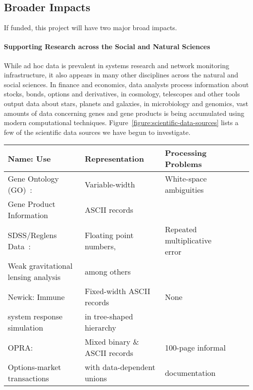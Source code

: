 \documentclass[11pt]{article}
\begin{document}
\subsection{Broader Impacts}
\label{ssec:impact}

If funded, this project will have two major broad impacts.

\paragraph*{Supporting Research across the Social and Natural Sciences}
While ad hoc data is prevalent in systems research and network monitoring
infrastructure, it also appears in many other disciplines
across the natural and social sciences. In finance and economics,
data analysts process information about stocks, bonds, options and derivatives,
in cosmology, telescopes and other tools output data about stars, planets and
galaxies, in microbiology and genomics, vast amounts of data concerning
genes and gene products is being accumulated using modern computational techniques.
Figure~\ref{figure:scientific-data-sources} lists a few of the scientific data sources
we have begun to investigate.

\begin{figure*}
\begin{center}
\begin{tabular}{@{}|l|l|l|l|l|}
\hline
Name: Use                           & Representation    & Processing Problems \\ \hline\hline
Gene Ontology (GO)~\cite{geneontology}:                  & Variable-width    & White-space ambiguities \\
Gene Product Information 	      & ASCII records &  \\ \hline
SDSS/Reglens Data~\cite{mandelbaum+:reglens}:                & Floating point numbers, & Repeated multiplicative error \\
Weak gravitational lensing analysis   & among others & \\ \hline
Newick:   Immune                    & Fixed-width ASCII records & None \\ 
system response simulation          & in tree-shaped hierarchy &\\ \hline                                
OPRA:                               & Mixed binary \& ASCII records 
                                                       & 100-page informal \\
Options-market transactions         & with data-dependent unions & documentation \\ \hline
\end{tabular}
\caption{Selected ad hoc scientific data sources.}
\label{figure:scientific-data-sources}
\end{center}
\end{figure*}
\end{document}
